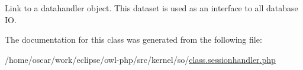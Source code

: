 Link to a datahandler object. This dataset is used as an interface to all database IO. 

The documentation for this class was generated from the following file:\begin{CompactItemize}
\item 
/home/oscar/work/eclipse/owl-php/src/kernel/so/\hyperlink{class_8sessionhandler_8php}{class.sessionhandler.php}\end{CompactItemize}
